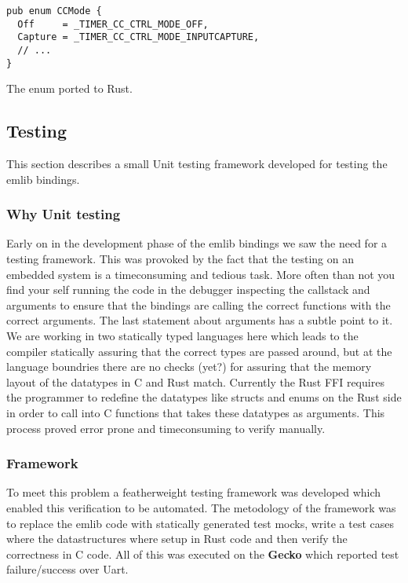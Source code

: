 \begin{listing}[h]
\begin{verbatim}
pub enum CCMode {
  Off     = _TIMER_CC_CTRL_MODE_OFF,
  Capture = _TIMER_CC_CTRL_MODE_INPUTCAPTURE,
  // ...
}
\end{verbatim}
\caption{The enum ported to Rust.}
\label{lst:enum_naming_rust}
\end{listing}

\subsection{Testing}
\label{ssub:testing}

This section describes a small Unit testing framework developed for testing the emlib bindings.

\subsubsection{Why Unit testing}

Early on in the development phase of the emlib bindings we saw the need for a testing framework.
This was provoked by the fact that the testing on an embedded system is a timeconsuming and tedious task.
More often than not you find your self running the code in the debugger inspecting the callstack and arguments to ensure that the bindings are calling the correct functions with the correct arguments.
The last statement about arguments has a subtle point to it.
We are working in two statically typed languages here which leads to the compiler statically assuring that the correct types are passed around, but at the language boundries there are no checks (yet?) for assuring that the memory layout of the datatypes in C and Rust match.
Currently the Rust FFI requires the programmer to redefine the datatypes like structs and enums on the Rust side in order to call into C functions that takes these datatypes as arguments.
This process proved error prone and timeconsuming to verify manually.

\subsubsection{Framework}

To meet this problem a featherweight testing framework was developed which enabled this verification to be automated.
The metodology of the framework was to replace the emlib code with statically generated test mocks, write a test cases where the datastructures where setup in Rust code and then verify the correctness in C code.
All of this was executed on the \textbf{Gecko} which reported test failure/success over Uart.

